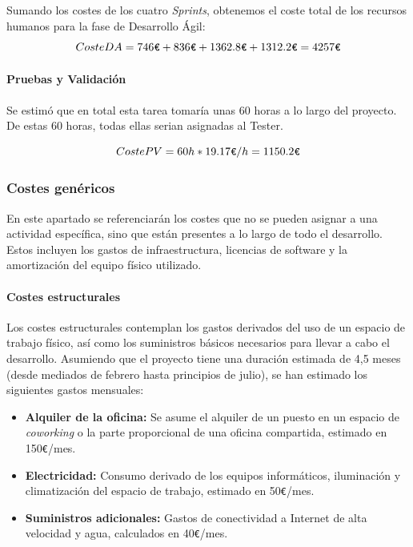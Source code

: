 \documentclass[11pt, letterpaper]{article}
\begin{document}
Sumando los costes de los cuatro \textit{Sprints}, obtenemos el coste total de los recursos humanos para la fase de Desarrollo Ágil:
\begin{equation}
    Coste DA = 746\verb|€| + 836\verb|€| + 1362{.}8\verb|€| + 1312{.}2\verb|€| = 4257\verb|€|
\end{equation}
\paragraph{Pruebas y Validación}
\label{sec:coste_pv}
Se estimó que en total esta tarea tomaría unas 60 horas a lo largo del proyecto. De estas 60 horas, todas ellas serian asignadas al Tester.

\begin{equation}
    Coste PV = 60h * 19{.}17\verb|€|/h = 1150{.}2\verb|€|
\end{equation}
\subsubsection{Costes genéricos}
\label{sec:costes_genericos}
En este apartado se referenciarán los costes que no se pueden asignar a una actividad específica, sino que están presentes a lo largo de todo el desarrollo. Estos incluyen los gastos de infraestructura, licencias de software y la amortización del equipo físico utilizado.

\paragraph{Costes estructurales}
\label{sec:costes_estructurales}
Los costes estructurales contemplan los gastos derivados del uso de un espacio de trabajo físico, así como los suministros básicos necesarios para llevar a cabo el desarrollo. Asumiendo que el proyecto tiene una duración estimada de 4,5 meses (desde mediados de febrero hasta principios de julio), se han estimado los siguientes gastos mensuales:

\begin{itemize}
    \item \textbf{Alquiler de la oficina:} Se asume el alquiler de un puesto en un espacio de \textit{coworking} o la parte proporcional de una oficina compartida, estimado en 150\verb|€|/mes. \cite{barcelona_coworking}
    \item \textbf{Electricidad:} Consumo derivado de los equipos informáticos, iluminación y climatización del espacio de trabajo, estimado en 50\verb|€|/mes. \cite{naturgy_precios}
    \item \textbf{Suministros adicionales:} Gastos de conectividad a Internet de alta velocidad y agua, calculados en 40\verb|€|/mes.
\end{itemize}
\end{document}
